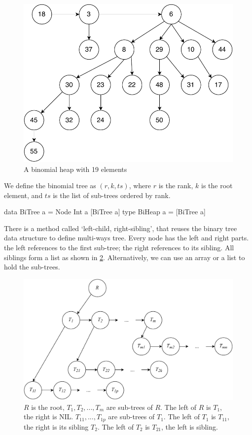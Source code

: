 \documentclass[b5paper]{article}
\begin{document}
\begin{figure}[htbp]
  \centering
  \includegraphics[scale=0.5]{img/binomial-heap}
  \caption{A binomial heap with 19 elements}
  \label{fig:bheap2}
\end{figure}

We define the binomial tree as $(r, k, ts)$, where $r$ is the rank, $k$ is the root element, and $ts$ is the list of sub-trees ordered by rank.

\lstset{frame=single}
\begin{Haskell}
data BiTree a = Node Int a [BiTree a]
type BiHeap a = [BiTree a]
\end{Haskell}

There is a method called `left-child, right-sibling'\cite{CLRS}, that reuses the binary tree data structure to define multi-ways tree. Every node has the left and right parts. the left references to the first sub-tree; the right references to its sibling. All siblings form a list as shown in \cref{fig:lcrs}. Alternatively, we can use an array or a list to hold the sub-trees.

\begin{figure}[htbp]
  \centering
  \includegraphics[scale=0.5]{img/left-child-right-sibling}
  \caption{$R$ is the root, $T_1, T_2, ..., T_m$ are sub-trees of $R$. The left of $R$ is $T_1$, the right is NIL. $T_{11}, ..., T_{1p}$ are sub-trees of $T_1$. The left of $T_1$ is $T_{11}$, the right is its sibling $T_2$. The left of $T_2$ is $T_{21}$, the left is sibling.}
  \label{fig:lcrs}
\end{figure}
\end{document}
